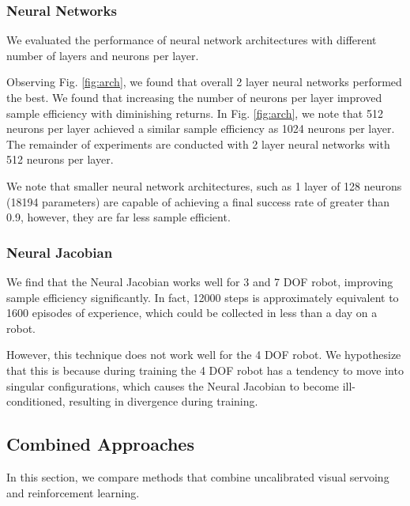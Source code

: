 \documentclass[letterpaper, 10 pt, conference]{ieeeconf}  %
\begin{document}
\subsubsection{Neural Networks}

We evaluated the performance of neural network architectures with different
number of layers and neurons per layer.

Observing Fig. \ref{fig:arch}, we found that overall 2 layer neural networks
performed the best. We found that increasing the number of neurons per layer
improved sample efficiency with diminishing returns. In Fig. \ref{fig:arch}, we
note that 512 neurons per layer achieved a similar sample efficiency as 1024
neurons per layer. The remainder of experiments are conducted with 2 layer
neural networks with 512 neurons per layer.

We note that smaller neural network architectures, such as 1 layer of 128 neurons (18194 parameters) are capable of
achieving a final success rate of greater than 0.9, however, they are far less
sample efficient.

\subsubsection{Neural Jacobian}

We find that the Neural Jacobian works well for 3 and 7 DOF robot, improving
sample efficiency significantly. In fact, 12000 steps is approximately
equivalent to 1600 episodes of experience, which could be collected in less
than a day on a robot.

However, this technique does not work well for
the 4 DOF robot. We hypothesize that this is because during training the 4 DOF
robot has a tendency to move into singular configurations, which causes the
Neural Jacobian to become ill-conditioned, resulting in divergence during
training.

\subsection{Combined Approaches}
In this section, we compare methods that combine uncalibrated visual servoing
and reinforcement learning.

\end{document}
